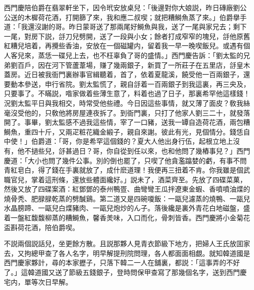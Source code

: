 西門慶陪伯爵在翡翠軒坐下，因令玳安放桌兒：「後邊對你大娘説，昨日磚廠劉公公送的木樨荷花酒，打開篩了來，我和應二叔喫；就把糟鰣魚蒸了來。」伯爵擧手道：「我還沒謝的哥。昨日蒙哥送了那兩尾好鰣魚與我，送了一尾與家兄去；剩下一尾，對房下説，㧱刀兒劈開，送了一段與小女；餘者打成窄窄的塊兒，㧱他原舊紅糟兒培着，再攪些香油，安放在一個磁罐内，留着我一早一晚喫飯兒。或遇有個人客兒來，蒸恁一碟兒上去，也不枉辜負了哥的盛情。」西門慶告訴：「劉太監的兄弟劉百戶，因在河下管蘆葦場，赚了幾兩銀子，新買了一所莊子在五里店，㧱皇木蓋房。近日被我衙門裏辦事官緝聽着，首了，依着夏龍溪，饒受他一百兩銀子，還要動本參送，申行省院。劉太監慌了，親自㧱着一百兩銀子到我這裏，再三央及，只要事了。不瞞説，喒家做着些薄生意了，料着也過了日子，那裏希罕他這樣錢！況劉太監平日與我相交，時常受他些禮。今日因這些事情，就又薄了面皮？敎我絲毫沒受他的，只敎他將房屋連夜拆了。到衙門裏，只打了他家人劉三二十，就發落開了。事畢，劉太監感不過我這些情，宰了一口豬，送我一罈自造荷花酒，兩包糟鰣魚，重四十斤，又兩疋粧花織金緞子，親自來謝。彼此有光，見個情分。錢恁自中使！」伯爵道：「哥，你是希罕這個錢的？夏大人他出身行伍，起根立地上沒有，他不撾些兒，㧱甚過日？哥，你自從到任以來，也和他問了幾樁事兒？」西門慶道：「大小也問了幾件公事。別的倒也罷了，只喫了他貪濫蹹婪的虧，有事不問青紅皂白，得了錢在手裏就放了，成什麽道理！我便再三扭着不肯。你我雖是個武職官兒，掌着這刑條，還放些體面纔好。」説未了，酒菜齊至。先放了四碟菜菓，然後又放了四碟案酒：紅鄧鄧的泰州鴨疍、曲彎彎王瓜拌遼東金蝦、香噴噴油煠的燒骨秃、肥䐂䐂乾蒸的劈醎鷄。第二道又是四碗嗄飯：一甌兒濾蒸的燒鴨、一甌兒水晶膀蹄、一甌兒白煠豬肉、一甌兒炮炒的ん子。落後纔是裏外青花白地磁盤，盛着一盤紅馥馥柳蒸的糟鰣魚，馨香羙味，入口而化，骨刺皆香。西門慶將小金菊花盃斟荷花酒，陪伯爵喫。

不説兩個説話兒，坐更餘方散。且説那夥人見青衣節級下地方，把婦人王氏放囬家去，又拘總甲查了各人名字，明早解提刑院問理，各人都面面相覷。就知韓道國是西門慶家夥計，尋的本家攊子，只落下韓二一人在舖裏，都説：「這事弄的不好了。」這韓道國又送了節級五錢銀子，登時問保甲查寫了那幾個名字，送到西門慶宅内，單等次日早解。

